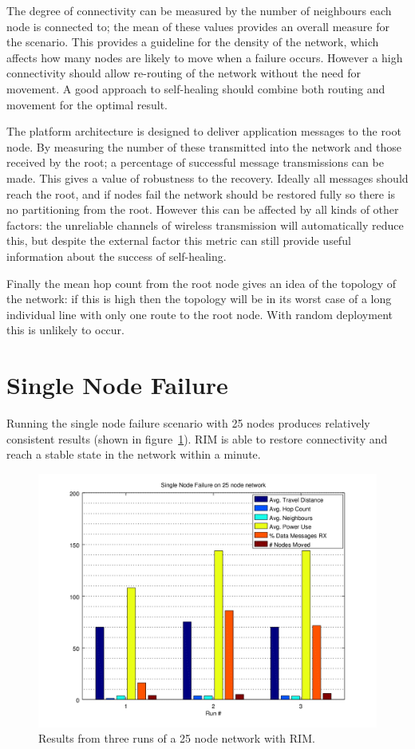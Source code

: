 \documentclass[authoryearcitations]{UoYCSproject}
\begin{document}
The degree of connectivity can be measured by the number of neighbours each node is connected to; the mean of these values provides an overall measure for the scenario. This provides a guideline for the density of the network, which affects how many nodes are likely to move when a failure occurs. However a high connectivity should allow re-routing of the network without the need for movement. A good approach to self-healing should combine both routing and movement for the optimal result.

The platform architecture is designed to deliver application messages to the root node. By measuring the number of these transmitted into the network and those received by the root; a percentage of successful message transmissions can be made. This gives a value of robustness to the recovery. Ideally all messages should reach the root, and if nodes fail the network should be restored fully so there is no partitioning from the root. However this can be affected by all kinds of other factors: the unreliable channels of wireless transmission will automatically reduce this, but despite the external factor this metric can still provide useful information about the success of self-healing.

Finally the mean hop count from the root node gives an idea of the topology of the network: if this is high then the topology will be in its worst case of a long individual line with only one route to the root node. With random deployment this is unlikely to occur.

\section{Single Node Failure}

Running the single node failure scenario with 25 nodes produces relatively consistent results (shown in figure~\ref{fig:singlefail_25node}). RIM is able to restore connectivity and reach a stable state in the network within a minute.

\begin{figure}
 \centering
    \includegraphics[width=\textwidth]{figures/singlefail_25node.png}
    \caption{Results from three runs of a 25 node network with RIM.}
    \label{fig:singlefail_25node}
\end{figure}
\end{document}
